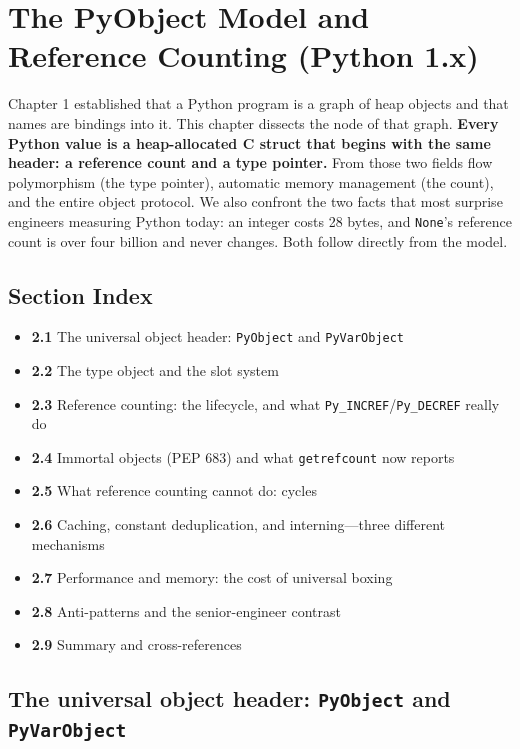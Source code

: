 \chapter{The PyObject Model and Reference Counting (Python 1.x)}

Chapter 1 established that a Python program is a graph of heap objects and that names are
bindings into it. This chapter dissects the node of that graph. \textbf{Every Python value
is a heap-allocated C struct that begins with the same header: a reference count and a type
pointer.} From those two fields flow polymorphism (the type pointer), automatic memory
management (the count), and the entire object protocol. We also confront the two facts that
most surprise engineers measuring Python today: an integer costs 28 bytes, and
\texttt{None}'s reference count is over four billion and never changes. Both follow directly
from the model.

\section*{Section Index}
\begin{itemize}
  \item \textbf{2.1} The universal object header: \texttt{PyObject} and \texttt{PyVarObject}
  \item \textbf{2.2} The type object and the slot system
  \item \textbf{2.3} Reference counting: the lifecycle, and what \texttt{Py\_INCREF}/\texttt{Py\_DECREF} really do
  \item \textbf{2.4} Immortal objects (PEP 683) and what \texttt{getrefcount} now reports
  \item \textbf{2.5} What reference counting cannot do: cycles
  \item \textbf{2.6} Caching, constant deduplication, and interning---three different mechanisms
  \item \textbf{2.7} Performance and memory: the cost of universal boxing
  \item \textbf{2.8} Anti-patterns and the senior-engineer contrast
  \item \textbf{2.9} Summary and cross-references
\end{itemize}

\section{The universal object header: \texttt{PyObject} and \texttt{PyVarObject}}


